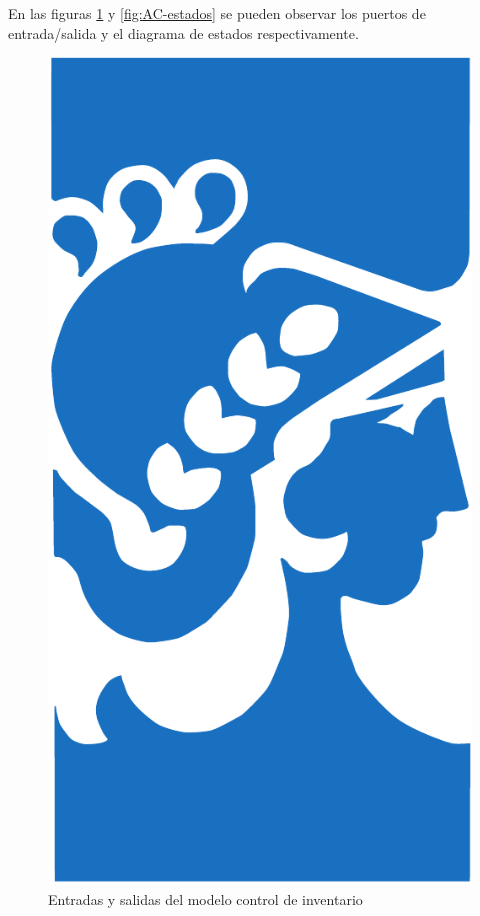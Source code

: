 \documentclass[10pt]{article}
\begin{document}
En las figuras \ref{fig:AC-esquematico} y \ref{fig:AC-estados} se pueden observar los puertos de entrada/salida y el diagrama de estados respectivamente.

\begin{figure}[htbp]
	\centering
	\includegraphics{img/fiuba}
	\caption{Entradas y salidas del modelo control de inventario}
	\label{fig:AC-esquematico}
\end{figure}
\end{document}
